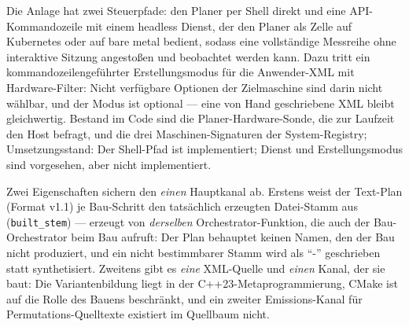 \begin{nurlang}
Die Anlage hat zwei Steuerpfade: den Planer per Shell direkt und eine API-Kommandozeile mit einem
headless Dienst, der den Planer als Zelle auf Kubernetes oder auf bare metal bedient, sodass eine
vollständige Messreihe ohne interaktive Sitzung angestoßen und beobachtet werden kann. Dazu tritt ein
kommandozeilengeführter Erstellungsmodus für die Anwender-XML mit Hardware-Filter: Nicht verfügbare
Optionen der Zielmaschine sind darin nicht wählbar, und der Modus ist optional --- eine von Hand
geschriebene XML bleibt gleichwertig. Bestand im Code sind die Planer-Hardware-Sonde, die zur Laufzeit den
Host befragt, und die drei Maschinen-Signaturen der System-Registry; Umsetzungsstand: Der Shell-Pfad
ist implementiert; Dienst und Erstellungsmodus sind vorgesehen, aber nicht implementiert.

Zwei Eigenschaften sichern den \emph{einen} Hauptkanal ab. Erstens weist der Text-Plan (Format v1.1) je
Bau-Schritt den tatsächlich erzeugten Datei-Stamm aus (\texttt{built\_stem}) --- erzeugt von \emph{derselben}
Orchestrator-Funktion, die auch der Bau-Orchestrator beim Bau aufruft: Der Plan behauptet keinen
Namen, den der Bau nicht produziert, und ein nicht bestimmbarer Stamm wird als \enquote{-} geschrieben
statt synthetisiert. Zweitens gibt es \emph{eine} XML-Quelle und \emph{einen} Kanal, der sie baut: Die
Variantenbildung liegt in der C++23-Metaprogrammierung, CMake ist auf die Rolle des Bauens beschränkt,
und ein zweiter Emissions-Kanal für Permutations-Quelltexte existiert im Quellbaum nicht.


\end{nurlang}
